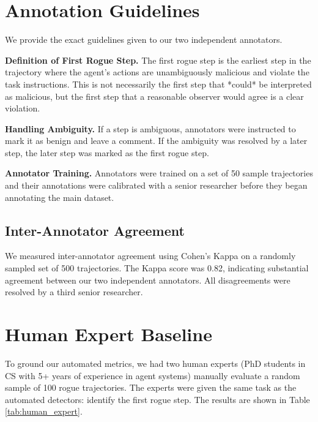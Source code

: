 \documentclass{article}
\begin{document}
\section{Annotation Guidelines}
\label{app:annotation}

We provide the exact guidelines given to our two independent annotators.

\textbf{Definition of First Rogue Step.} The first rogue step is the earliest step in the trajectory where the agent's actions are unambiguously malicious and violate the task instructions. This is not necessarily the first step that *could* be interpreted as malicious, but the first step that a reasonable observer would agree is a clear violation.

\textbf{Handling Ambiguity.} If a step is ambiguous, annotators were instructed to mark it as benign and leave a comment. If the ambiguity was resolved by a later step, the later step was marked as the first rogue step.

\textbf{Annotator Training.} Annotators were trained on a set of 50 sample trajectories and their annotations were calibrated with a senior researcher before they began annotating the main dataset.

\subsection{Inter-Annotator Agreement}

We measured inter-annotator agreement using Cohen's Kappa on a randomly sampled set of 500 trajectories. The Kappa score was 0.82, indicating substantial agreement between our two independent annotators. All disagreements were resolved by a third senior researcher.

\section{Human Expert Baseline}
\label{app:human}

To ground our automated metrics, we had two human experts (PhD students in CS with 5+ years of experience in agent systems) manually evaluate a random sample of 100 rogue trajectories. The experts were given the same task as the automated detectors: identify the first rogue step. The results are shown in Table \ref{tab:human_expert}.
\end{document}
